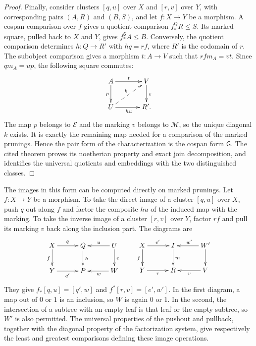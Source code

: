 \documentclass[11pt,a4paper]{article}
\theoremstyle{plain}
\theoremstyle{definition}
\theoremstyle{remark}
\begin{document}
\begin{proof}
Finally, consider clusters $[q,u]$ over $X$ and $[r,v]$ over
$Y$, with corresponding pairs $(A,R)$ and $(B,S)$, and let
$f:X\to Y$ be a morphism. A cospan comparison over $f$ gives
a quotient comparison
$f_*^{\mathsf Q}R\le S$. Its marked square, pulled back to
$X$ and $Y$, gives $f_*^{\mathsf S}A\le B$. Conversely,
the quotient comparison determines $h:Q\to R'$ with
$hq=rf$, where $R'$ is the codomain of $r$. The subobject
comparison gives a morphism $t:A\to V$ such that $rfm_A=vt$.
Since $qm_A=up$, the following square commutes:
\[
\xymatrix@C=3.5em@R=2.4em{
A\ar[r]^t\ar[d]_p&V\ar[d]^v\\
U\ar[r]_{hu}\ar@{-->}[ur]^k&R'.
}
\]
The map $p$ belongs to $\mathcal E$ and the marking $v$
belongs to $\mathcal M$, so the unique diagonal $k$ exists.
It is exactly the remaining map needed for a comparison of
the marked prunings. Hence the pair form
of the characterization is the cospan form $\mathsf G$.
The cited theorem proves its noetherian property and exact join
decomposition, and identifies the universal quotients and
embeddings with the two distinguished classes.
\end{proof}

The images in this form can be computed directly on marked
prunings. Let $f:X\to Y$ be a morphism. To take the direct
image of a cluster $[q,u]$ over $X$, push $q$ out along $f$
and factor the composite $hu$ of the induced map with the
marking. To take the inverse image of a cluster $[r,v]$ over
$Y$, factor $rf$ and pull its marking $v$ back along the
inclusion part. The diagrams are
\[
 \xymatrix@C=3em@R=2.3em{
 X\ar[r]^q\ar[d]_f&Q\ar[d]^h&U\ar[l]_u\ar[d]^e\\
 Y\ar[r]_{q'}&P&W\ar[l]^w
 }
 \qquad
 \xymatrix@C=3em@R=2.3em{
 X\ar[r]^{e'}\ar[d]_f&I\ar[d]^m&W'\ar[l]_{w'}\ar[d]\\
 Y\ar[r]_r&R&V\ar[l]^v
 }
\]
They give $f_*[q,u]=[q',w]$ and $f^*[r,v]=[e',w']$.
In the first diagram, a map out of $0$ or $1$ is an inclusion,
so $W$ is again $0$ or $1$. In the second, the intersection
of a subtree with an empty leaf is that leaf or the empty
subtree, so $W'$ is also permitted. The universal properties
of the pushout and pullback, together with the diagonal
property of the factorization system, give respectively the
least and greatest comparisons defining these image operations.
\end{document}
